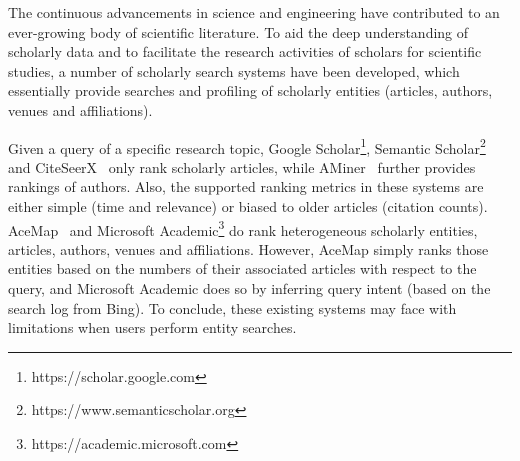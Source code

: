 

The continuous advancements in science and engineering have contributed to an ever-growing body of scientific literature.
To aid the deep understanding of scholarly data and to facilitate the research activities of scholars for scientific studies, a number of  scholarly search systems have been developed, which essentially provide searches and profiling of scholarly entities (articles, authors, venues and affiliations).





Given a query of a specific research topic,  Google Scholar\footnote{ https://scholar.google.com}, Semantic Scholar\footnote{ https://www.semanticscholar.org} and CiteSeerX~\cite{li2006citeseerx} only rank scholarly articles, while AMiner~\cite{tang2008arnetminer} further provides rankings of authors. Also, the supported ranking metrics in these systems are either simple (\eg time and relevance) or biased to older articles (\eg citation counts).
%
AceMap~\cite{tan2016acemap} and Microsoft Academic\footnote{https://academic.microsoft.com} do rank heterogeneous scholarly entities, \ie articles, authors, venues and affiliations. However, AceMap simply ranks those entities based on the numbers of their associated articles with respect to the query, and Microsoft Academic does so by inferring query intent (based on the search log from Bing).
%
To conclude, these existing systems may face with limitations when users perform entity searches.

